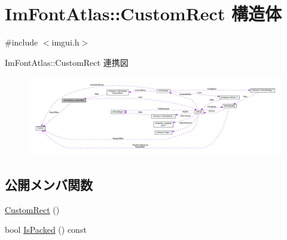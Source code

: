 \hypertarget{struct_im_font_atlas_1_1_custom_rect}{}\section{Im\+Font\+Atlas\+:\+:Custom\+Rect 構造体}
\label{struct_im_font_atlas_1_1_custom_rect}


{\ttfamily \#include $<$imgui.\+h$>$}



Im\+Font\+Atlas\+:\+:Custom\+Rect 連携図\nopagebreak
\begin{figure}[H]
\begin{center}
\leavevmode
\includegraphics[width=350pt]{struct_im_font_atlas_1_1_custom_rect__coll__graph}
\end{center}
\end{figure}
\subsection*{公開メンバ関数}
\begin{DoxyCompactItemize}
\item 
\mbox{\hyperlink{struct_im_font_atlas_1_1_custom_rect_abee2845214da5ffc9c77bb388402a0a9}{Custom\+Rect}} ()
\item 
bool \mbox{\hyperlink{struct_im_font_atlas_1_1_custom_rect_ac15602342c8eabbddf559bc84a3e6700}{Is\+Packed}} () const
\end{DoxyCompactItemize}

